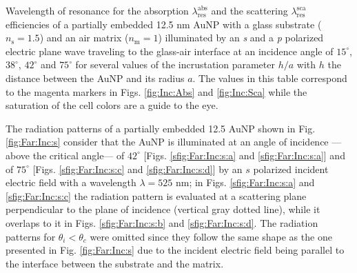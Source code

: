 \begin{table}[h!]\footnotesize\centering
    \caption{Wavelength of resonance for the absorption $\lambda_\text{res}^\text{abs}$ and the scattering $\lambda_\text{res}^\text{sca}$ efficiencies of a partially embedded 12.5 nm AuNP with a glass substrate ($n_\text{s} = 1.5$) and an air matrix ($n_\text{m} = 1$)    illuminated by an \textit{s} and a \textit{p} polarized electric plane wave traveling to the glass-air interface at an incidence angle of $15^\circ$,  $38^\circ$,  $42^\circ$ and  $75^\circ$ for several values of the incrustation parameter $h/a$ with $h$ the distance between the AuNP and its radius $a$. The values in this table correspond to the magenta markers in Figs. \ref{fig:Inc:Abs} and \ref{fig:Inc:Sca} while the saturation of the cell colors are a guide to the eye.}
    \label{tab:Resonances}
    
\end{table}











The radiation patterns of a partially embedded 12.5 AuNP shown in Fig. \ref{fig:Far:Inc:s} consider that the AuNP is illuminated at an angle of incidence ---above the critical angle--- of $42^\circ$ [Figs. \ref{sfig:Far:Inc:s:a} and \ref{sfig:Far:Inc:s:a}] and of $75^\circ$ [Figs. \ref{sfig:Far:Inc:s:c} and \ref{sfig:Far:Inc:s:d}] by an $s$ polarized incident electric field with a wavelength $\lambda = 525$ nm; in Figs. \ref{sfig:Far:Inc:s:a} and   \ref{sfig:Far:Inc:s:c} the radiation pattern is evaluated at a scattering plane perpendicular to the plane of incidence (vertical gray dotted line), while it overlaps to it in  Figs. \ref{sfig:Far:Inc:s:b} and   \ref{sfig:Far:Inc:s:d}. The radiation patterns for $\theta_i<\theta_c$ were omitted since they follow the same shape as the one presented in Fig. \ref{fig:Far:Inc:s} due to the incident electric field being parallel to the interface between the substrate and the matrix.

